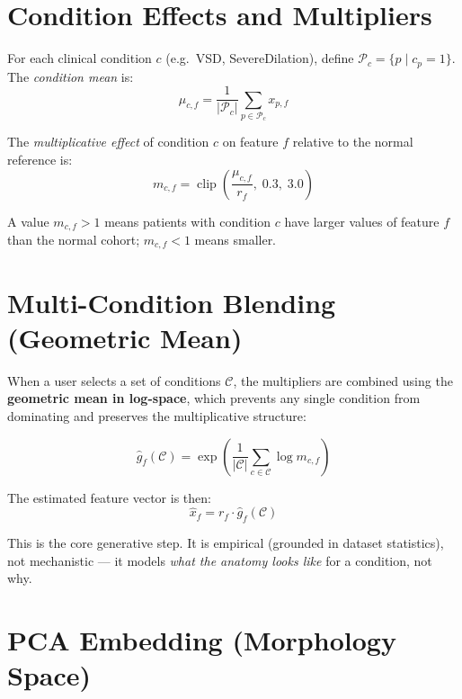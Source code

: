 \documentclass[11pt]{article}
\begin{document}
\section{Condition Effects and Multipliers}

For each clinical condition $c$ (e.g.\ VSD, SevereDilation), define
$\mathcal{P}_c = \{p \mid c_p = 1\}$.
The \emph{condition mean} is:
\[
    \mu_{c,f} = \frac{1}{|\mathcal{P}_c|} \sum_{p \in \mathcal{P}_c} x_{p,f}
\]

The \emph{multiplicative effect} of condition $c$ on feature $f$ relative
to the normal reference is:
\begin{equation}
    m_{c,f} = \operatorname{clip}\!\left(\frac{\mu_{c,f}}{r_f},\; 0.3,\; 3.0\right)
\end{equation}

A value $m_{c,f} > 1$ means patients with condition $c$ have larger
values of feature $f$ than the normal cohort; $m_{c,f} < 1$ means smaller.

\section{Multi-Condition Blending (Geometric Mean)}

When a user selects a set of conditions $\mathcal{C}$, the multipliers are
combined using the \textbf{geometric mean in log-space}, which prevents any
single condition from dominating and preserves the multiplicative structure:

\begin{equation}
    \hat{g}_f(\mathcal{C})
        = \exp\!\left(\frac{1}{|\mathcal{C}|} \sum_{c \in \mathcal{C}} \log m_{c,f}\right)
\end{equation}

The estimated feature vector is then:
\begin{equation}
    \hat{x}_f = r_f \cdot \hat{g}_f(\mathcal{C})
\end{equation}

This is the core generative step. It is empirical (grounded in dataset statistics),
not mechanistic — it models \emph{what the anatomy looks like} for a condition,
not why.

\section{PCA Embedding (Morphology Space)}
\end{document}
